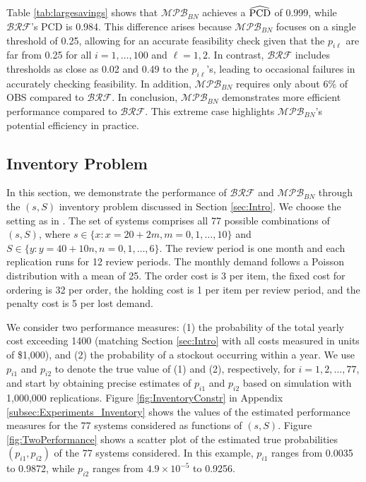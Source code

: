 \documentclass[11pt]{article}
\begin{document}
Table \ref{tab:largesavings}  shows that $\mathcal{MPB}_{BN}$ achieves a $\widehat{{\rm PCD}}$ of 0.999, while $\mathcal{BRF}$'s PCD is 0.984. This difference arises because $\mathcal{MPB}_{BN}$ focuses on a single threshold of 0.25, allowing for an accurate feasibility check given that the $p_{i\ell}$ are far from 0.25 for all $i=1,\ldots,100$ and $\ell=1,2$. In contrast, $\mathcal{BRF}$ includes thresholds as close as 0.02 and 0.49 to the $p_{i\ell}$'s, leading to occasional failures in accurately checking feasibility. In addition, $\mathcal{MPB}_{BN}$ requires only about 6\% of OBS compared to $\mathcal{BRF}$. In conclusion, $\mathcal{MPB}_{BN}$ demonstrates more efficient performance compared to $\mathcal{BRF}$. This extreme case highlights $\mathcal{MPB}_{BN}$'s potential efficiency in practice.

\subsection{Inventory Problem}
\label{subsec:InventoryExp}

In this section, we demonstrate the performance of $\mathcal{BRF}$ and $\mathcal{MPB}_{BN}$ through the $(s, S)$ inventory problem discussed in Section \ref{sec:Intro}. We choose the setting as in \cite{law2007simulation}. 
The set of systems comprises all 77 possible combinations of $(s, S)$, where $s \in \{x: x = 20 + 2m, m = 0, 1, \ldots, 10\}$ and $S \in \{y: y = 40 + 10n, n = 0, 1, \ldots, 6\}$. The review period is one month and each replication runs for 12 review periods. The monthly demand follows a Poisson distribution with a mean of 25. The order cost is 3 per item, the fixed cost for ordering is 32 per order, the holding cost is 1 per item per review period, and the penalty cost is 5 per lost demand.

We consider two performance measures: (1) the probability of the total yearly cost exceeding 1400 (matching Section \ref{sec:Intro} with all costs measured in units of \$1,000), and (2) the probability of a stockout occurring within a year. We use $p_{i1}$ and $p_{i2}$ to denote the true value of (1) and (2), respectively, for $i=1,2,\ldots, 77$, and start by obtaining precise estimates of $p_{i1}$ and $p_{i2}$ based on simulation with 1,000,000 replications. 
Figure \ref{fig:InventoryConstr} in Appendix \ref{subsec:Experiments_Inventory} shows  the values of the estimated performance measures for the 77 systems considered as functions of $(s, S)$. Figure \ref{fig:TwoPerformance} shows a scatter plot of the estimated true probabilities $(p_{i1}, p_{i2})$ of the 77 systems considered. 
In this example, $p_{i1}$ ranges from 0.0035 to 0.9872, while $p_{i2}$ ranges from $4.9\times 10^{-5}$ to 0.9256.
\end{document}
